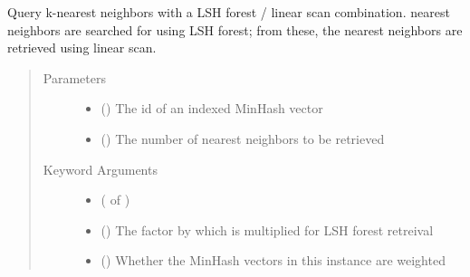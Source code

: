 \documentclass[letterpaper,10pt,english]{sphinxmanual}
\begin{document}
\begin{fulllineitems}
\begin{fulllineitems}
\label{\detokenize{documentation:tmap.LSHForest.query_linear_scan_exclude_by_id}}
Query k-nearest neighbors with a LSH forest / linear scan combination.  nearest neighbors are searched for using LSH forest; from these, the  nearest neighbors are retrieved using linear scan.
\begin{quote}\begin{description}
\item[{Parameters}] \leavevmode\begin{itemize}
\item {} 
 () \textendash{} The id of an indexed MinHash vector

\item {} 
 () \textendash{} The number of nearest neighbors to be retrieved

\end{itemize}

\item[{Keyword Arguments}] \leavevmode\begin{itemize}
\item {} 
 ( of ) \textendash{} 

\item {} 
 () \textendash{} The factor by which  is multiplied for LSH forest retreival

\item {} 
 () \textendash{} Whether the MinHash vectors in this {\hyperref[\detokenize{documentation:tmap.LSHForest}]{}} instance are weighted

\end{itemize}


\end{description}
\end{quote}
\end{fulllineitems}
\end{fulllineitems}
\end{document}
